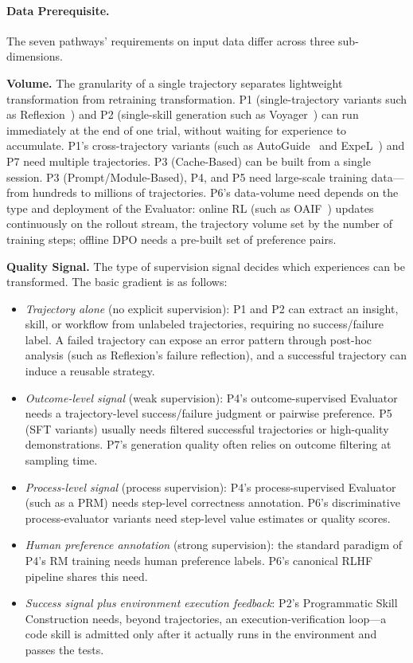 \paragraph{Data Prerequisite.} The seven pathways' requirements on input data differ across three sub-dimensions.

\textbf{Volume.} The granularity of a single trajectory separates lightweight transformation from retraining transformation. P1 (single-trajectory variants such as Reflexion~\cite{Shi23b}) and P2 (single-skill generation such as Voyager~\cite{Wan23c}) can run immediately at the end of one trial, without waiting for experience to accumulate. P1's cross-trajectory variants (such as AutoGuide~\cite{Fu24} and ExpeL~\cite{Zha23c}) and P7 need multiple trajectories. P3 (Cache-Based) can be built from a single session. P3 (Prompt/Module-Based), P4, and P5 need large-scale training data---from hundreds to millions of trajectories. P6's data-volume need depends on the type and deployment of the Evaluator: online RL (such as OAIF~\cite{Guo24}) updates continuously on the rollout stream, the trajectory volume set by the number of training steps; offline DPO needs a pre-built set of preference pairs.

\textbf{Quality Signal.} The type of supervision signal decides which experiences can be transformed. The basic gradient is as follows:
\begin{itemize}
  \item \emph{Trajectory alone} (no explicit supervision): P1 and P2 can extract an insight, skill, or workflow from unlabeled trajectories, requiring no success/failure label. A failed trajectory can expose an error pattern through post-hoc analysis (such as Reflexion's failure reflection), and a successful trajectory can induce a reusable strategy.
  \item \emph{Outcome-level signal} (weak supervision): P4's outcome-supervised Evaluator needs a trajectory-level success/failure judgment or pairwise preference. P5 (SFT variants) usually needs filtered successful trajectories or high-quality demonstrations. P7's generation quality often relies on outcome filtering at sampling time.
  \item \emph{Process-level signal} (process supervision): P4's process-supervised Evaluator (such as a PRM) needs step-level correctness annotation. P6's discriminative process-evaluator variants need step-level value estimates or quality scores.
  \item \emph{Human preference annotation} (strong supervision): the standard paradigm of P4's RM training needs human preference labels. P6's canonical RLHF pipeline shares this need.
  \item \emph{Success signal plus environment execution feedback}: P2's Programmatic Skill Construction needs, beyond trajectories, an execution-verification loop---a code skill is admitted only after it actually runs in the environment and passes the tests.
\end{itemize}

